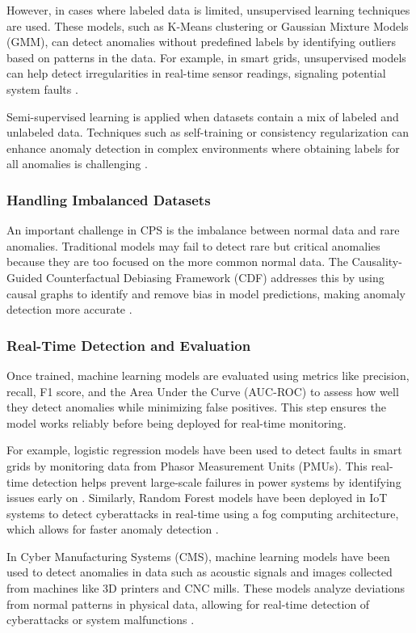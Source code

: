 However, in cases where labeled data is limited, unsupervised learning techniques are used. These models, such as K-Means clustering or Gaussian Mixture Models (GMM), can detect anomalies without predefined labels by identifying outliers based on patterns in the data. For example, in smart grids, unsupervised models can help detect irregularities in real-time sensor readings, signaling potential system faults \cite{66}.

Semi-supervised learning is applied when datasets contain a mix of labeled and unlabeled data. Techniques such as self-training or consistency regularization can enhance anomaly detection in complex environments where obtaining labels for all anomalies is challenging \cite{44}.

\subsubsection{Handling Imbalanced Datasets}

An important challenge in CPS is the imbalance between normal data and rare anomalies. Traditional models may fail to detect rare but critical anomalies because they are too focused on the more common normal data. The Causality-Guided Counterfactual Debiasing Framework (CDF) addresses this by using causal graphs to identify and remove bias in model predictions, making anomaly detection more accurate \cite{90}.

\subsubsection{Real-Time Detection and Evaluation}

Once trained, machine learning models are evaluated using metrics like precision, recall, F1 score, and the Area Under the Curve (AUC-ROC) to assess how well they detect anomalies while minimizing false positives. This step ensures the model works reliably before being deployed for real-time monitoring.

For example, logistic regression models have been used to detect faults in smart grids by monitoring data from Phasor Measurement Units (PMUs). This real-time detection helps prevent large-scale failures in power systems by identifying issues early on \cite{66}. Similarly, Random Forest models have been deployed in IoT systems to detect cyberattacks in real-time using a fog computing architecture, which allows for faster anomaly detection \cite{78, 85}.

In Cyber Manufacturing Systems (CMS), machine learning models have been used to detect anomalies in data such as acoustic signals and images collected from machines like 3D printers and CNC mills. These models analyze deviations from normal patterns in physical data, allowing for real-time detection of cyberattacks or system malfunctions \cite{52}.

